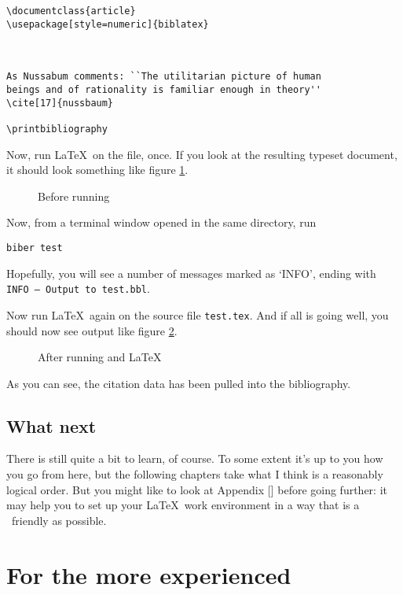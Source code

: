 \begin{verbatim}
\documentclass{article}
\usepackage[style=numeric]{biblatex}



As Nussabum comments: ``The utilitarian picture of human
beings and of rationality is familiar enough in theory''
\cite[17]{nussbaum}

\printbibliography

\end{verbatim}

Now, run \LaTeX\ on the file, once. If you look at the resulting typeset document, it should look something like figure \ref{nussbaum1}.

\begin{figure}
\caption{Before running }\label{nussbaum1}
\end{figure}

Now, from a terminal window opened in the same directory, run
\begin{verbatim}
biber test
\end{verbatim}

Hopefully, you will see a number of messages marked as `INFO', ending with \texttt{INFO -- Output to test.bbl}.

Now run \LaTeX\ again on the source file \verb|test.tex|. And if all is going well, you should now see output like figure \ref{nussbaum2}.

\begin{figure}
\caption{After running  and \LaTeX}\label{nussbaum2}
\end{figure}

As you can see, the citation data has been pulled into the bibliography.

\subsection{What next}

There is still quite a bit to learn, of course. To some extent it's up to you how you go from here, but the following chapters take what I think is a reasonably logical order. But you might like to look at Appendix [] before going further: it may help you to set up your \LaTeX\ work environment in a way that is a \biblatex\ friendly as possible.

\section{For the more experienced}

